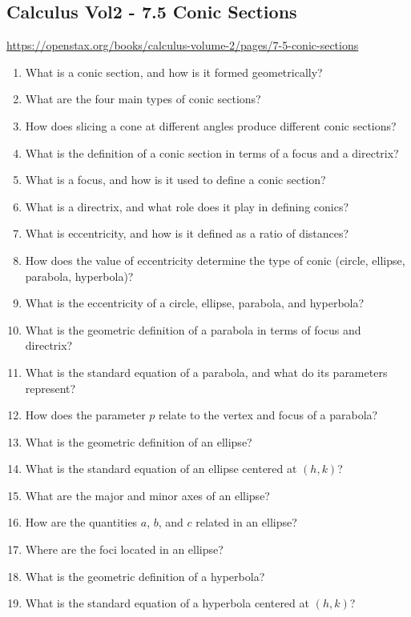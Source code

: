 \subsection{Calculus Vol2 - 7.5 Conic Sections}

\url{https://openstax.org/books/calculus-volume-2/pages/7-5-conic-sections}

\begin{enumerate}
  \item What is a conic section, and how is it formed geometrically?
  \item What are the four main types of conic sections?
  \item How does slicing a cone at different angles produce different conic sections?
  \item What is the definition of a conic section in terms of a focus and a directrix?
  \item What is a focus, and how is it used to define a conic section?
  \item What is a directrix, and what role does it play in defining conics?
  \item What is eccentricity, and how is it defined as a ratio of distances?
  \item How does the value of eccentricity determine the type of conic (circle, ellipse, parabola, hyperbola)?
  \item What is the eccentricity of a circle, ellipse, parabola, and hyperbola?
  \item What is the geometric definition of a parabola in terms of focus and directrix?
  \item What is the standard equation of a parabola, and what do its parameters represent?
  \item How does the parameter \(p\) relate to the vertex and focus of a parabola?
  \item What is the geometric definition of an ellipse?
  \item What is the standard equation of an ellipse centered at \((h,k)\)?
  \item What are the major and minor axes of an ellipse?
  \item How are the quantities \(a\), \(b\), and \(c\) related in an ellipse?
  \item Where are the foci located in an ellipse?
  \item What is the geometric definition of a hyperbola?
  \item What is the standard equation of a hyperbola centered at \((h,k)\)?

\end{enumerate}
